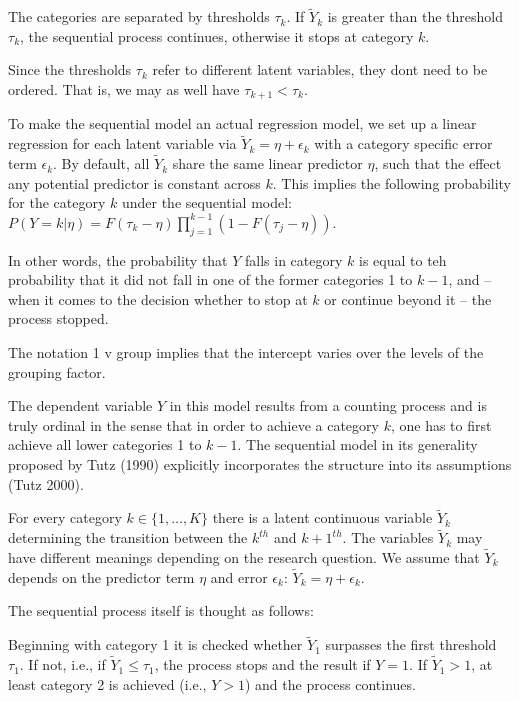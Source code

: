The categories are separated by thresholds $\tau_{k}$. If $\tilde Y_{k}$ is greater than the threshold $\tau_{k}$, the sequential process continues, otherwise it stops at category $k$.

Since the thresholds $\tau_{k}$ refer to different latent variables, they dont need to be ordered. That is, we may as well have $\tau_{k+1} < \tau_{k}$.

To make the sequential model an actual regression model, we set up a linear regression for each latent variable via $\tilde Y_{k} = \eta + \epsilon_{k}$ with a category specific error term $\epsilon_{k}$. By default, all $\tilde Y_{k}$ share the same linear predictor $\eta$, such that the effect any potential predictor is constant across $k$. This implies the following probability for the category $k$ under the sequential model: $P(Y=k | \eta) = F(\tau_{k} - \eta) \prod_{j=1}^{k-1} ( 1 - F(\tau_{j} - \eta) )$.

In other words, the probability that $Y$ falls in category $k$ is equal to teh probability that it did not fall in one of the former categories 1 to $k-1$, and -- when it comes to the decision whether to stop at $k$ or continue beyond it -- the process stopped.

The notation 1 v group implies that the intercept varies over the levels of the grouping factor.

The dependent variable $Y$ in this model results from a counting process and is truly ordinal in the sense that in order to achieve a category $k$, one has to first achieve all lower categories 1 to $k-1$. The sequential model in its generality proposed by Tutz (1990) explicitly incorporates the structure into its assumptions (Tutz 2000).

For every category $k \in \{1, \ldots, K \}$ there is a latent continuous variable $\tilde Y_{k}$ determining the transition between the $k^{th}$ and $k+1^{th}$. The variables $\tilde Y_{k}$ may have different meanings depending on the research question. We assume that $\tilde Y_{k}$ depends on the predictor term $\eta$ and error $\epsilon_{k}$: $\tilde Y_{k} = \eta + \epsilon_{k}$.

The sequential process itself is thought as follows:

Beginning with category 1 it is checked whether $\tilde Y_{1}$ surpasses the first threshold $\tau_{1}$. If not, i.e., if $\tilde Y_{1} \leq \tau_{1}$, the process stops and the result if $Y=1$. If $\tilde Y_{1} > 1$, at least category 2 is achieved (i.e., $Y>1$) and the process continues.

